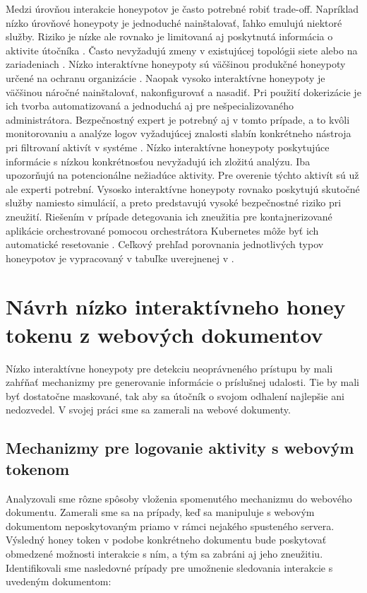 \documentclass[conference, 11pt,slovak,a4paper,twoside]{IEEEtran}
\begin{document}
Medzi úrovňou interakcie honeypotov je často potrebné robiť trade-off. Napríklad nízko úrovňové honeypoty je jednoduché nainštalovať, ľahko emulujú niektoré služby. Riziko je nízke ale rovnako je limitovaná aj poskytnutá informácia o aktivite útočníka \cite{spitzner_honeypots_2002}. Často nevyžadujú zmeny v existujúcej topológii siete alebo na zariadeniach \cite{scada_2014}. Nízko interaktívne honeypoty sú väčšinou produkčné honeypoty určené na ochranu organizácie \cite{spitzner_honeypots_2002}. Naopak vysoko interaktívne honeypoty je väčšinou náročné nainštalovať, nakonfigurovať a nasadiť. Pri použití dokerizácie je ich tvorba automatizovaná a jednoduchá aj pre nešpecializovaného administrátora. Bezpečnostný expert je potrebný aj v tomto prípade, a to kvôli monitorovaniu a analýze logov vyžadujúcej znalosti slabín konkrétneho nástroja pri filtrovaní aktivít v systéme \cite{valicek_creation_2017}. Nízko interaktívne honeypoty poskytujúce informácie s nízkou konkrétnosťou nevyžadujú ich zložitú analýzu. Iba upozorňujú na potencionálne nežiadúce aktivity. Pre overenie týchto aktivít sú už ale experti potrební. Vysosko interaktívne honeypoty rovnako poskytujú skutočné služby namiesto simulácií, a preto predstavujú vysoké bezpečnostné riziko pri zneužití. Riešením v prípade detegovania ich zneužitia pre kontajnerizované aplikácie orchestrované pomocou orchestrátora Kubernetes môže byť ich automatické resetovanie \cite{reti_escape_2021}. Ceľkový prehľad porovnania jednotlivých typov honeypotov je vypracovaný v tabuľke uverejnenej v \cite{nagpal_catch_2015}. 



\section{Návrh nízko interaktívneho honey tokenu z webových dokumentov}

Nízko interaktívne honeypoty pre detekciu neoprávneného prístupu by mali zahŕňať mechanizmy pre generovanie informácie o príslušnej udalosti. Tie by mali byť dostatočne maskované, tak aby sa útočník o svojom odhalení najlepšie ani nedozvedel. V svojej práci sme sa zamerali na webové dokumenty. 


\subsection{Mechanizmy pre logovanie aktivity s webovým tokenom}

Analyzovali sme rôzne spôsoby vloženia spomenutého mechanizmu do webového dokumentu. Zamerali sme sa na prípady, keď sa manipuluje s webovým dokumentom neposkytovaným priamo v rámci nejakého spusteného servera. Výsledný honey token v podobe konkrétneho dokumentu bude poskytovať obmedzené možnosti interakcie s ním, a tým sa zabráni aj jeho zneužitiu. Identifikovali sme nasledovné prípady pre umožnenie sledovania interakcie s uvedeným dokumentom:
\end{document}
